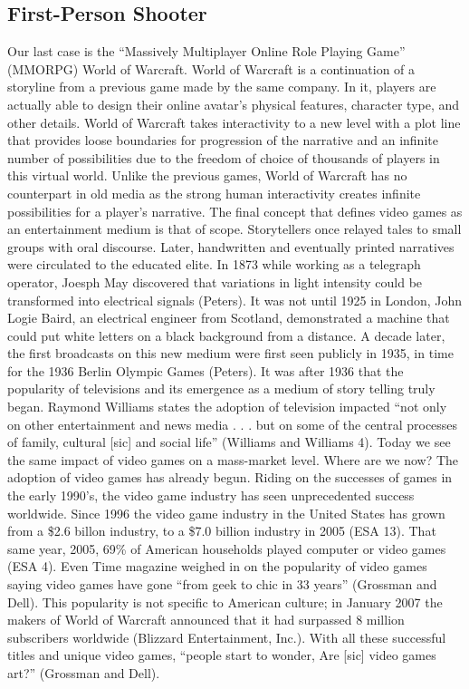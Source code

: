 \subsection{First-Person Shooter}
Our last case is the “Massively Multiplayer Online Role Playing Game” (MMORPG) World of Warcraft.  World of Warcraft is a continuation of a storyline from a previous game made by the same company.  In it, players are actually able to design their online avatar’s physical features, character type, and other details.  World of Warcraft takes interactivity to a new level with a plot line that provides loose boundaries for progression of the narrative and an infinite number of possibilities due to the freedom of choice of thousands of players in this virtual world.  Unlike the previous games, World of Warcraft has no counterpart in old media as the strong human interactivity creates infinite possibilities for a player’s narrative. 
The final concept that defines video games as an entertainment medium is that of scope.  Storytellers once relayed tales to small groups with oral discourse.  Later, handwritten and eventually printed narratives were circulated to the educated elite. In 1873 while working as a telegraph operator, Joesph May discovered that variations in light intensity could be transformed into electrical signals (Peters). It was not until 1925 in London, John Logie Baird, an electrical engineer from Scotland, demonstrated a machine that could put white letters on a black background from a distance. A decade later, the first broadcasts on this new medium were first seen publicly in 1935, in time for the 1936 Berlin Olympic Games (Peters). It was after 1936 that the popularity of televisions and its emergence as a medium of story telling truly began. Raymond Williams states the adoption of television impacted “not only on other entertainment and news media . . . but on some of the central processes of family, cultural [sic] and social life” (Williams and Williams 4).  Today we see the same impact of video games on a mass-market level.
Where are we now?  The adoption of video games has already begun. Riding on the successes of games in the early 1990’s, the video game industry has seen unprecedented success worldwide. Since 1996 the video game industry in the United States has grown from a \$2.6 billon industry, to a \$7.0 billion industry in 2005 (ESA 13). That same year, 2005, 69\% of American households played computer or video games (ESA 4). Even Time magazine weighed in on the popularity of video games saying video games have gone “from geek to chic in 33 years” (Grossman and Dell). This popularity is not specific to American culture; in January 2007 the makers of World of Warcraft announced that it had surpassed 8 million subscribers worldwide (Blizzard Entertainment, Inc.).  With all these successful titles and unique video games, “people start to wonder, Are [sic] video games art?” (Grossman and Dell). 
